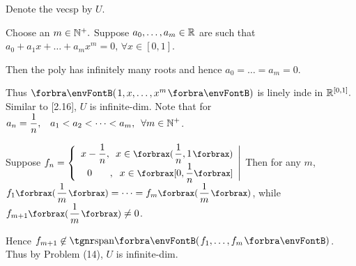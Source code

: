 \documentclass[a4paper, 11pt, UTF8]{article}
\begin{document}
\begin{large}

Denote the vecsp by $U$.\par\quad
Choose an $m\in{\mathbb{N}^+}.$ Suppose $a_0,\dots,a_m\in{\mathbb{R}}$ are such that $a_0+a_1 x+\dots+a_m x^m=0,\,\forall x\in[0,1].$\par\quad
Then the poly has infinitely many roots and hence $a_0=\dots=a_m=0$.\par\quad
Thus $\Par{1,x,\dots,x^m}$ is linely inde in ${\mathbb{R}}^{[0,1]}.$ Similar to [2.16], $U$ is infinite-dim.\PfEnd\vspace{10pt}\quad
\Or Note that for $a_n=\displaystyle\frac{1}{n},\,\,\,\,\,a_1<a_2<\dots<a_m,\,\,\,\forall m\in{\mathbb{N}^+}$.\par\quad
Suppose $f_n=\left\{\begin{array}{r}x-{\displaystyle\frac{1}{n}},\,\,\,x\in\XPar{\displaystyle\frac{1}{n},1}\\0\quad\;\;\;,\;\;x\in\XSbra{0,\displaystyle\frac{1}{n}}\end{array}\right|$
Then for any $m$, $f_1\XPar{\displaystyle\frac{1}{m}}=\dots=f_m\XPar{\displaystyle\frac{1}{m}}$, while $f_{m+1}\XPar{\displaystyle\frac{1}{m}}\neq 0$.\par\vspace{6pt}\quad
Hence $f_{m+1}\not\in\Span{f_1,\dots,f_m}$. Thus by Problem (14), $U$ is infinite-dim.\PfEnd
\SepLine


\end{large}
\end{document}
